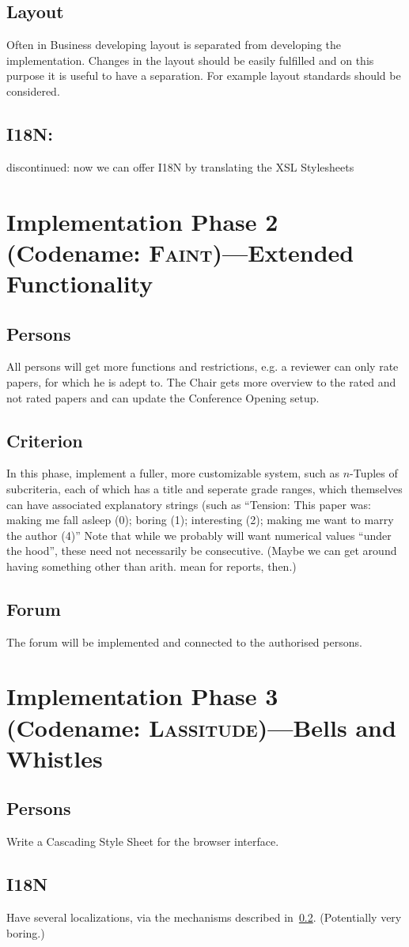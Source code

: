 \documentclass[a4paper]{article}
\begin{document}
  \subsection{Layout} \label{sec:1:layout}
  Often in Business developing layout is separated from developing the implementation. Changes in the layout should be easily fulfilled and on this purpose it is useful to have a separation. For example layout standards should be considered.
  \subsection{I18N:}\label{sec:1:i18n}
  discontinued: now we can offer I18N by translating the XSL Stylesheets
 
  \section{Implementation Phase 2 (Codename: \textsc{Faint})---Extended Functionality}
	\subsection{Persons}\label{sec:2:persons}
	All persons will get more functions and restrictions, e.g. a reviewer can only rate papers, for which he is adept to.
	The Chair gets more overview to the rated and not rated papers and can update the Conference Opening setup.
  \subsection{Criterion}\label{sec:2:criterion}
  In this phase, implement a fuller, more customizable system, such as
  $n$-Tuples of subcriteria, each of which has a title and seperate
  grade ranges, which themselves can have associated explanatory
  strings (such as ``Tension: This paper was: making me fall asleep
  (0); boring (1); interesting (2); making me want to marry the author
  (4)'' Note that while we probably will want numerical values ``under
  the hood'', these need not necessarily be consecutive. (Maybe we can
  get around having something other than arith. mean for reports,
  then.)
 \subsection{Forum}\label{sec:2:forum}
 The forum will be implemented and connected to the authorised persons.
  \section{Implementation Phase 3 (Codename: \textsc{Lassitude})---Bells and Whistles}
  \subsection{Persons }\label{sec:3:persons}
  Write a Cascading Style Sheet for the browser interface.
  \subsection{I18N}
  Have several localizations, via the mechanisms described
  in~\ref{sec:1:i18n}. (Potentially very boring.)
 
\end{document}
